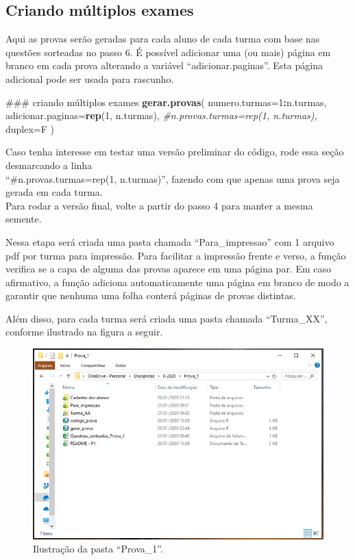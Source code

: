 \documentclass[a4paper]{report}
\newenvironment{Shaded}{\begin{snugshade}}{\end{snugshade}}
\newcommand{\KeywordTok}[1]{\textcolor[rgb]{0.13,0.29,0.53}{\textbf{#1}}}
\newcommand{\DataTypeTok}[1]{\textcolor[rgb]{0.13,0.29,0.53}{#1}}
\newcommand{\DecValTok}[1]{\textcolor[rgb]{0.00,0.00,0.81}{#1}}
\newcommand{\CommentTok}[1]{\textcolor[rgb]{0.56,0.35,0.01}{\textit{#1}}}
\newcommand{\OperatorTok}[1]{\textcolor[rgb]{0.81,0.36,0.00}{\textbf{#1}}}
\newcommand{\NormalTok}[1]{#1}
\begin{document}
\subsection{Criando múltiplos exames}

Aqui as provas serão geradas para cada aluno de cada turma com base nas
questões sorteadas no passo 6. É possível adicionar uma (ou mais) página
em branco em cada prova alterando a variável ``adicionar.paginas''. Esta
página adicional pode ser usada para rascunho.

\begin{Shaded}
\begin{Highlighting}[]
\NormalTok{### criando múltiplos exames}
\KeywordTok{gerar.provas}\NormalTok{(}
  \DataTypeTok{numero.turmas=}\DecValTok{1}\OperatorTok{:}\NormalTok{n.turmas,}
  \DataTypeTok{adicionar.paginas=}\KeywordTok{rep}\NormalTok{(}\DecValTok{1}\NormalTok{, n.turmas),}
  \CommentTok{#n.provas.turmas=rep(1, n.turmas),}
  \DataTypeTok{duplex=}\NormalTok{F}
\NormalTok{)}
\end{Highlighting}
\end{Shaded}

Caso tenha interesse em testar uma versão preliminar do código, rode
essa seção desmarcando a linha\\
``\#n.provas.turmas=rep(1, n.turmas)'', fazendo com que apenas uma prova
seja gerada em cada turma.\\
Para rodar a versão final, volte a partir do passo 4 para manter a mesma
semente.

Nessa etapa será criada uma pasta chamada ``Para\_impressao'' com 1
arquivo pdf por turma para impressão. Para facilitar a impressão frente
e verso, a função verifica se a capa de alguma das provas aparece em uma
página par. Em caso afirmativo, a função adiciona automaticamente uma
página em branco de modo a garantir que nenhuma uma folha conterá
páginas de provas distintas.

Além disso, para cada turma será criada uma pasta chamada ``Turma\_XX'',
conforme ilustrado na figura a seguir.

\begin{figure}
\centering
\includegraphics{imagens/pasta_prova1b.png}
\caption{Ilustração da pasta ``Prova\_1''.}
\end{figure}
\end{document}
